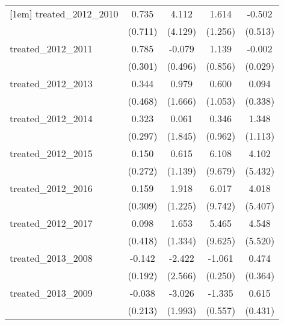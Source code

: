 {\begin{tabular}{l*{4}{c}}
[1em]
treated\_2012\_2010&       0.735         &       4.112         &       1.614         &      -0.502         \\
            &     (0.711)         &     (4.129)         &     (1.256)         &     (0.513)         \\
[1em]
treated\_2012\_2011&       0.785\sym{**} &      -0.079         &       1.139         &      -0.002         \\
            &     (0.301)         &     (0.496)         &     (0.856)         &     (0.029)         \\
[1em]
treated\_2012\_2013&       0.344         &       0.979         &       0.600         &       0.094         \\
            &     (0.468)         &     (1.666)         &     (1.053)         &     (0.338)         \\
[1em]
treated\_2012\_2014&       0.323         &       0.061         &       0.346         &       1.348         \\
            &     (0.297)         &     (1.845)         &     (0.962)         &     (1.113)         \\
[1em]
treated\_2012\_2015&       0.150         &       0.615         &       6.108         &       4.102         \\
            &     (0.272)         &     (1.139)         &     (9.679)         &     (5.432)         \\
[1em]
treated\_2012\_2016&       0.159         &       1.918         &       6.017         &       4.018         \\
            &     (0.309)         &     (1.225)         &     (9.742)         &     (5.407)         \\
[1em]
treated\_2012\_2017&       0.098         &       1.653         &       5.465         &       4.548         \\
            &     (0.418)         &     (1.334)         &     (9.625)         &     (5.520)         \\
[1em]
treated\_2013\_2008&      -0.142         &      -2.422         &      -1.061\sym{***}&       0.474         \\
            &     (0.192)         &     (2.566)         &     (0.250)         &     (0.364)         \\
[1em]
treated\_2013\_2009&      -0.038         &      -3.026         &      -1.335\sym{*}  &       0.615         \\
            &     (0.213)         &     (1.993)         &     (0.557)         &     (0.431)         \\

\end{tabular}}
